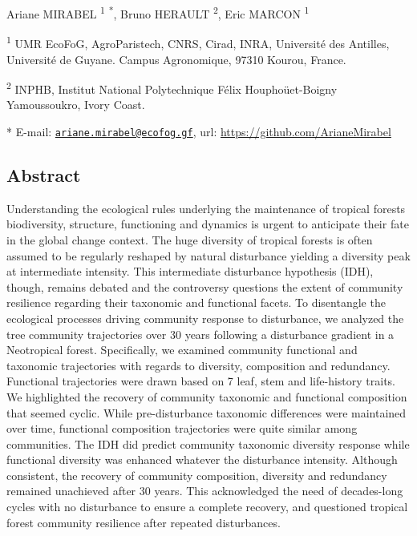 \documentclass[
  11pt,
  french,
  A4paper,
  extrafontsizes,onecolumn,openright
  ]{memoir}
\begin{document}
Ariane MIRABEL \textsuperscript{1} \textsuperscript{*}, Bruno HERAULT
\textsuperscript{2}, Eric MARCON \textsuperscript{1} \newline

\textsuperscript{1} UMR EcoFoG, AgroParistech, CNRS, Cirad, INRA,
Université des Antilles, Université de Guyane. Campus Agronomique, 97310
Kourou, France.

\textsuperscript{2} INPHB, Institut National Polytechnique Félix
Houphoüet-Boigny Yamoussoukro, Ivory Coast. \newline

* E-mail:
\href{mailto:ariane.mirabel@ecofog.gf}{\nolinkurl{ariane.mirabel@ecofog.gf}},
url: \url{https://github.com/ArianeMirabel}

\subsection{Abstract}\label{abstract-1}

Understanding the ecological rules underlying the maintenance of
tropical forests biodiversity, structure, functioning and dynamics is
urgent to anticipate their fate in the global change context. The huge
diversity of tropical forests is often assumed to be regularly reshaped
by natural disturbance yielding a diversity peak at intermediate
intensity. This intermediate disturbance hypothesis (IDH), though,
remains debated and the controversy questions the extent of community
resilience regarding their taxonomic and functional facets. To
disentangle the ecological processes driving community response to
disturbance, we analyzed the tree community trajectories over 30 years
following a disturbance gradient in a Neotropical forest. Specifically,
we examined community functional and taxonomic trajectories with regards
to diversity, composition and redundancy. Functional trajectories were
drawn based on 7 leaf, stem and life-history traits. We highlighted the
recovery of community taxonomic and functional composition that seemed
cyclic. While pre-disturbance taxonomic differences were maintained over
time, functional composition trajectories were quite similar among
communities. The IDH did predict community taxonomic diversity response
while functional diversity was enhanced whatever the disturbance
intensity. Although consistent, the recovery of community composition,
diversity and redundancy remained unachieved after 30 years. This
acknowledged the need of decades-long cycles with no disturbance to
ensure a complete recovery, and questioned tropical forest community
resilience after repeated disturbances.
\end{document}
